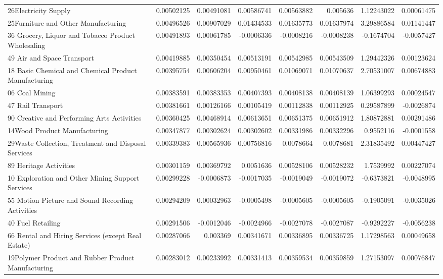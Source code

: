 \documentclass{monashthesis}
\begin{document}
\begin{table}[ht]
{\begin{tabular}{|l|r|rrrr|rr|}
    26Electricity Supply & 0.00502125 & 0.00491081 & 0.00586741 & 0.00563882 & 0.005636 & 1.12243022 & 0.00061475 \\
    25Furniture and Other Manufacturing & 0.00496526 & 0.00907029 & 0.01434533 & 0.01635773 & 0.01637974 & 3.29886584 & 0.01141447 \\
    36 Grocery, Liquor and Tobacco Product Wholesaling & 0.00491893 & 0.00061785 & -0.0006336 & -0.0008216 & -0.0008238 & -0.1674704 & -0.0057427 \\
    49 Air and Space Transport & 0.00419885 & 0.00350454 & 0.00513191 & 0.00542985 & 0.00543509 & 1.29442326 & 0.00123624 \\
    18 Basic Chemical and Chemical Product Manufacturing & 0.00395754 & 0.00606204 & 0.00950461 & 0.01069071 & 0.01070637 & 2.70531007 & 0.00674883 \\
    06 Coal Mining & 0.00383591 & 0.00383353 & 0.00407393 & 0.00408138 & 0.00408139 & 1.06399293 & 0.00024547 \\
    47 Rail Transport & 0.00381661 & 0.00126166 & 0.00105419 & 0.00112838 & 0.00112925 & 0.29587899 & -0.0026874 \\
    90 Creative and Performing Arts Activities & 0.00360425 & 0.00468914 & 0.00613651 & 0.00651375 & 0.00651912 & 1.80872881 & 0.00291486 \\
    14Wood Product Manufacturing & 0.00347877 & 0.00302624 & 0.00302602 & 0.00331986 & 0.00332296 & 0.9552116 & -0.0001558 \\
    29Waste Collection, Treatment and Disposal Services & 0.00339383 & 0.00565936 & 0.00756816 & 0.0078664 & 0.0078681 & 2.31835492 & 0.00447427 \\
    89 Heritage Activities & 0.00301159 & 0.00369792 & 0.0051636 & 0.00528106 & 0.00528232 & 1.7539992 & 0.00227074 \\
    10 Exploration and Other Mining Support Services & 0.00299228 & -0.0006873 & -0.0017035 & -0.0019049 & -0.0019072 & -0.6373821 & -0.0048995 \\
    55 Motion Picture and Sound Recording Activities & 0.00294209 & 0.00032963 & -0.0005498 & -0.0005605 & -0.0005605 & -0.1905091 & -0.0035026 \\
    40 Fuel Retailing & 0.00291506 & -0.0012046 & -0.0024966 & -0.0027078 & -0.0027087 & -0.9292227 & -0.0056238 \\
    66 Rental and Hiring Services (except Real Estate) & 0.00287066 & 0.003369 & 0.00341671 & 0.00336895 & 0.00336725 & 1.17298563 & 0.00049658 \\
    19Polymer Product and Rubber Product Manufacturing & 0.00283012 & 0.00233992 & 0.00331413 & 0.00359534 & 0.00359859 & 1.27153097 & 0.00076847 \\

\end{tabular}}
\end{table}
\end{document}
